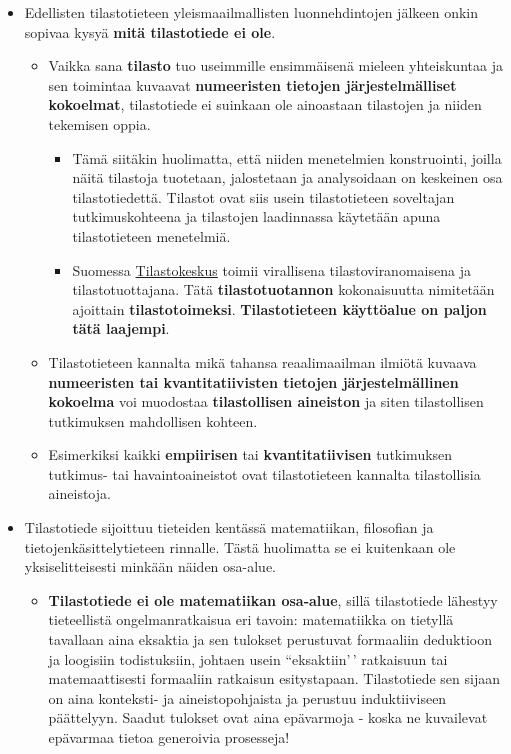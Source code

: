 \documentclass[
]{book}
\providecommand{\tightlist}{%
  \setlength{\itemsep}{0pt}\setlength{\parskip}{0pt}}
\begin{document}
\begin{itemize}
\item
  Edellisten tilastotieteen yleismaailmallisten luonnehdintojen jälkeen onkin sopivaa kysyä \textbf{mitä tilastotiede ei ole}.

  \begin{itemize}
  \tightlist
  \item
    Vaikka sana \textbf{tilasto} tuo useimmille ensimmäisenä mieleen yhteiskuntaa ja sen toimintaa kuvaavat \textbf{numeeristen tietojen järjestelmälliset kokoelmat}, tilastotiede ei suinkaan ole ainoastaan tilastojen ja niiden tekemisen oppia.

    \begin{itemize}
    \tightlist
    \item
      Tämä siitäkin huolimatta, että niiden menetelmien konstruointi, joilla näitä tilastoja tuotetaan, jalostetaan ja analysoidaan on keskeinen osa tilastotiedettä. Tilastot ovat siis usein tilastotieteen soveltajan tutkimuskohteena ja tilastojen laadinnassa käytetään apuna tilastotieteen menetelmiä.
    \item
      Suomessa \href{https://www.stat.fi/}{Tilastokeskus} toimii virallisena tilastoviranomaisena ja tilastotuottajana. Tätä \textbf{tilastotuotannon} kokonaisuutta nimitetään ajoittain \textbf{tilastotoimeksi}. \textbf{Tilastotieteen käyttöalue on paljon tätä laajempi}.
    \end{itemize}
  \item
    Tilastotieteen kannalta mikä tahansa reaalimaailman ilmiötä kuvaava \textbf{numeeristen tai kvantitatiivisten tietojen järjestelmällinen kokoelma} voi muodostaa \textbf{tilastollisen aineiston} ja siten tilastollisen tutkimuksen mahdollisen kohteen.
  \item
    Esimerkiksi kaikki \textbf{empiirisen} tai \textbf{kvantitatiivisen}
    tutkimuksen tutkimus- tai havaintoaineistot ovat tilastotieteen kannalta tilastollisia aineistoja.
  \end{itemize}
\item
  Tilastotiede sijoittuu tieteiden kentässä matematiikan, filosofian ja tietojenkäsittelytieteen rinnalle. Tästä huolimatta se ei kuitenkaan ole yksiselitteisesti minkään näiden osa-alue.

  \begin{itemize}
  \tightlist
  \item
    \textbf{Tilastotiede ei ole matematiikan osa-alue}, sillä tilastotiede lähestyy tieteellistä ongelmanratkaisua eri tavoin: matematiikka on tietyllä tavallaan aina eksaktia ja sen tulokset perustuvat formaaliin deduktioon ja loogisiin todistuksiin, johtaen usein ``eksaktiin'\,' ratkaisuun tai matemaattisesti formaaliin ratkaisun esitystapaan. Tilastotiede sen sijaan on aina konteksti- ja aineistopohjaista ja perustuu induktiiviseen päättelyyn. Saadut tulokset ovat aina epävarmoja - koska ne kuvailevat epävarmaa tietoa generoivia prosesseja!


\end{itemize}
\end{itemize}
\end{document}
